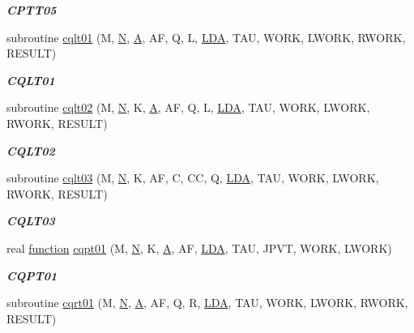 \begin{DoxyCompactItemize}
\begin{DoxyCompactList}\small\item\em {\bfseries C\+P\+T\+T05} \end{DoxyCompactList}\item 
subroutine \hyperlink{group__complex__lin_gaeea18df7db12316d5da38892b7903601}{cqlt01} (M, \hyperlink{polmisc_8c_a0240ac851181b84ac374872dc5434ee4}{N}, \hyperlink{classA}{A}, A\+F, Q, L, \hyperlink{example__user_8c_ae946da542ce0db94dced19b2ecefd1aa}{L\+D\+A}, T\+A\+U, W\+O\+R\+K, L\+W\+O\+R\+K, R\+W\+O\+R\+K, R\+E\+S\+U\+L\+T)
\begin{DoxyCompactList}\small\item\em {\bfseries C\+Q\+L\+T01} \end{DoxyCompactList}\item 
subroutine \hyperlink{group__complex__lin_gab080d7fb44320b600b7bd3c4af7e3ad8}{cqlt02} (M, \hyperlink{polmisc_8c_a0240ac851181b84ac374872dc5434ee4}{N}, K, \hyperlink{classA}{A}, A\+F, Q, L, \hyperlink{example__user_8c_ae946da542ce0db94dced19b2ecefd1aa}{L\+D\+A}, T\+A\+U, W\+O\+R\+K, L\+W\+O\+R\+K, R\+W\+O\+R\+K, R\+E\+S\+U\+L\+T)
\begin{DoxyCompactList}\small\item\em {\bfseries C\+Q\+L\+T02} \end{DoxyCompactList}\item 
subroutine \hyperlink{group__complex__lin_gab5386eddee9eac48af5fd4ab24349143}{cqlt03} (M, \hyperlink{polmisc_8c_a0240ac851181b84ac374872dc5434ee4}{N}, K, A\+F, C, C\+C, Q, \hyperlink{example__user_8c_ae946da542ce0db94dced19b2ecefd1aa}{L\+D\+A}, T\+A\+U, W\+O\+R\+K, L\+W\+O\+R\+K, R\+W\+O\+R\+K, R\+E\+S\+U\+L\+T)
\begin{DoxyCompactList}\small\item\em {\bfseries C\+Q\+L\+T03} \end{DoxyCompactList}\item 
real \hyperlink{afunc_8m_a7b5e596df91eadea6c537c0825e894a7}{function} \hyperlink{group__complex__lin_gaeafe81c8254a4f8879ad9367809ba27d}{cqpt01} (M, \hyperlink{polmisc_8c_a0240ac851181b84ac374872dc5434ee4}{N}, K, \hyperlink{classA}{A}, A\+F, \hyperlink{example__user_8c_ae946da542ce0db94dced19b2ecefd1aa}{L\+D\+A}, T\+A\+U, J\+P\+V\+T, W\+O\+R\+K, L\+W\+O\+R\+K)
\begin{DoxyCompactList}\small\item\em {\bfseries C\+Q\+P\+T01} \end{DoxyCompactList}\item 
subroutine \hyperlink{group__complex__lin_ga596d337be7b445964a8747625a3f2fd5}{cqrt01} (M, \hyperlink{polmisc_8c_a0240ac851181b84ac374872dc5434ee4}{N}, \hyperlink{classA}{A}, A\+F, Q, R, \hyperlink{example__user_8c_ae946da542ce0db94dced19b2ecefd1aa}{L\+D\+A}, T\+A\+U, W\+O\+R\+K, L\+W\+O\+R\+K, R\+W\+O\+R\+K, R\+E\+S\+U\+L\+T)

\end{DoxyCompactItemize}
